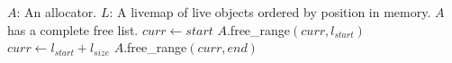 \begin{algorithm}{}
    \caption{$(A,L)$}
    \label{alg:reloc}
    \begin{algorithmic}[1]
        \Require 
        \Statex $A$: An allocator.
        \Statex $L$: A livemap of live objects ordered by position in memory. 
        \Ensure 
        \Statex $A$ has a complete free list.
        \State $curr\gets start$ 
        \State $A$.free\_range$(curr, l_{start})$ 
        \EndIf
        \State $curr\gets l_{start} + l_{size}$ 
        \EndFor
        \State $A$.free\_range$(curr,end)$ 
    \end{algorithmic}
\end{algorithm}

